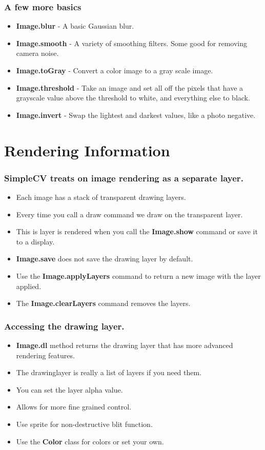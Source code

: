 \documentclass[compress]{beamer}
\begin{document}
\begin{frame}
\frametitle{A few more basics}
\begin{itemize}
  \item \textbf{Image.blur} - A basic Gaussian blur. 
  \item \textbf{Image.smooth} - A variety of smoothing filters. Some
    good for removing camera noise. 
  \item \textbf{Image.toGray} - Convert a color image to a gray scale
    image.
  \item \textbf{Image.threshold} - Take an image and set all off the
    pixels that have a grayscale value above the threshold to white,
    and everything else to black.
 \item \textbf{Image.invert} - Swap the lightest and darkest values,
   like a photo negative. 
\end{itemize}
\end{frame}
\section{Rendering Information}
\begin{frame}
\frametitle{SimpleCV treats on image rendering as a separate layer.}
\begin{itemize}
  \item Each image has a stack of transparent drawing layers. 
  \item Every time you call a draw command we draw on the transparent layer.
  \item This is layer is rendered when you call the
    \textbf{Image.show} command or save it to a display.
  \item \textbf{Image.save} does not save the drawing layer by default.
 \item Use the \textbf{Image.applyLayers} command to return a new
   image with the layer applied.
   \item The \textbf{Image.clearLayers} command removes the layers.
\end{itemize}
\end{frame}
\begin{frame}
\frametitle{Accessing the drawing layer.}
\begin{itemize}
  \item \textbf{Image.dl} method returns the drawing layer that has
      more advanced rendering features. 
  \item The drawinglayer is really a list of layers if you need them.
  \item You can set the layer alpha value. 
  \item Allows for more fine grained control.
  \item Use sprite for non-destructive blit function.
  \item Use the \textbf{Color} class for colors or set your own. 
\end{itemize}
\end{frame}
\end{document}
